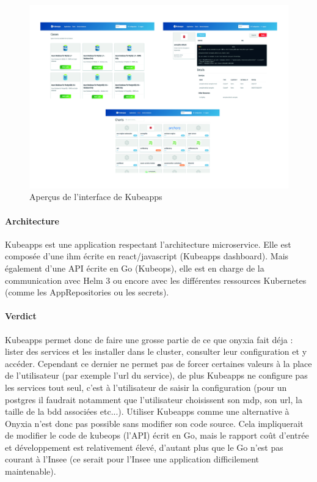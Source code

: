 \documentclass[11pt,fleqn]{book} %
\begin{document}
\begin{figure}[H]\centering
\renewcommand{\figurename}{Capture d'écran}
\hspace{-1cm}
\includegraphics[scale=0.10]{Pictures/onyxia/kubeapps.jpg}
\captionsetup{margin=1.5cm,format=hang,justification=justified}
\caption[]{Aperçus de l'interface de Kubeapps \newline}
\end{figure}

\paragraph{Architecture}
Kubeapps est une application respectant l'architecture microservice. Elle est composée d'une ihm écrite en react/javascript (Kubeapps dashboard). Mais également d'une API écrite en Go (Kubeops), elle est en charge de la communication avec Helm 3 ou encore avec les différentes ressources Kubernetes (comme les AppRepositories ou les secrets).\\

\paragraph{Verdict}
Kubeapps permet donc de faire une grosse partie de ce que onyxia fait déja : lister des services et les installer dans le cluster, consulter leur configuration et y accéder. Cependant ce dernier ne permet pas de forcer certaines valeurs à la place de l'utilisateur (par exemple l'url du service),  de plus Kubeapps ne configure pas les services tout seul, c'est à l'utilisateur de saisir la configuration (pour un postgres il faudrait notamment que l'utilisateur choisissent son mdp, son url, la taille de la bdd associées etc...). Utiliser Kubeapps comme une alternative à Onyxia n'est donc pas possible sans modifier son code source. Cela impliquerait de modifier le code de kubeops (l'API) écrit en Go, mais le rapport coût d'entrée et développement est relativement élevé, d'autant plus que le Go n'est pas courant à l'Insee (ce serait pour l'Insee une application difficilement maintenable).\newline
\end{document}
